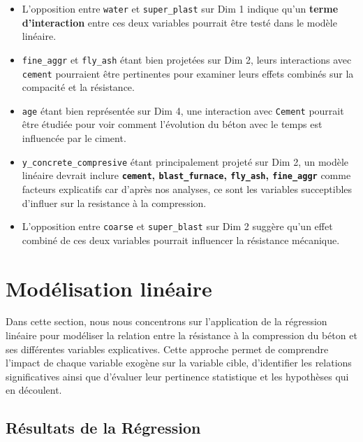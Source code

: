 \documentclass[
  12pt,
]{article}
\providecommand{\tightlist}{%
  \setlength{\itemsep}{0pt}\setlength{\parskip}{0pt}}
\begin{document}
\begin{itemize}
\tightlist
\item
  L'opposition entre \texttt{water} et \texttt{super\_plast} sur Dim 1
  indique qu'un \textbf{terme d'interaction} entre ces deux variables
  pourrait être testé dans le modèle linéaire.
\item
  \texttt{fine\_aggr} et \texttt{fly\_ash} étant bien projetées sur Dim
  2, leurs interactions avec \texttt{cement} pourraient être pertinentes
  pour examiner leurs effets combinés sur la compacité et la résistance.
\item
  \texttt{age} étant bien représentée sur Dim 4, une interaction avec
  \texttt{Cement} pourrait être étudiée pour voir comment l'évolution du
  béton avec le temps est influencée par le ciment.
\item
  \texttt{y\_concrete\_compresive} étant principalement projeté sur Dim
  2, un modèle linéaire devrait inclure \textbf{\texttt{cement},
  \texttt{blast\_furnace}, \texttt{fly\_ash}, \texttt{fine\_aggr}} comme
  facteurs explicatifs car d'après nos analyses, ce sont les variables
  succeptibles d'influer sur la resistance à la compression.
\item
  L'opposition entre \texttt{coarse} et \texttt{super\_blast} sur Dim 2
  suggère qu'un effet combiné de ces deux variables pourrait influencer
  la résistance mécanique.
\end{itemize}

\newpage

\section{Modélisation linéaire}\label{moduxe9lisation-linuxe9aire}

Dans cette section, nous nous concentrons sur l'application de la
régression linéaire pour modéliser la relation entre la résistance à la
compression du béton et ses différentes variables explicatives. Cette
approche permet de comprendre l'impact de chaque variable exogène sur la
variable cible, d'identifier les relations significatives ainsi que
d'évaluer leur pertinence statistique et les hypothèses qui en
découlent.

\subsection{Résultats de la
Régression}\label{ruxe9sultats-de-la-ruxe9gression}
\end{document}
